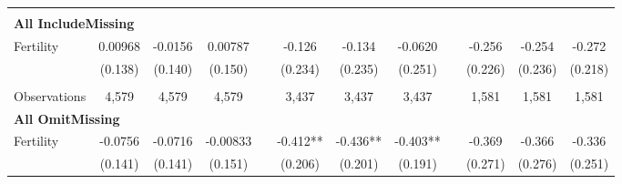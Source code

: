 \begin{landscape}
\begin{table}[htpb!]
\begin{center}
\begin{tabular}{lcccp{2mm}cccp{2mm}ccc}
\begin{footnotesize}\end{footnotesize}\\ 
\multicolumn{12}{l}{\textbf{All IncludeMissing}}\\ 
Fertility&0.00968&-0.0156&0.00787&&-0.126&-0.134&-0.0620&&-0.256&-0.254&-0.272\\
&(0.138)&(0.140)&(0.150)&&(0.234)&(0.235)&(0.251)&&(0.226)&(0.236)&(0.218)\\
\begin{footnotesize}\end{footnotesize}&\begin{footnotesize}\end{footnotesize}&\begin{footnotesize}\end{footnotesize}&\begin{footnotesize}\end{footnotesize}&\begin{footnotesize}\end{footnotesize}&\begin{footnotesize}\end{footnotesize}&\begin{footnotesize}\end{footnotesize}&\begin{footnotesize}\end{footnotesize}&\begin{footnotesize}\end{footnotesize}&\begin{footnotesize}\end{footnotesize}&\begin{footnotesize}\end{footnotesize}&\begin{footnotesize}\end{footnotesize}\\Observations&4,579&4,579&4,579&&3,437&3,437&3,437&&1,581&1,581&1,581\\
\multicolumn{12}{l}{\textbf{All OmitMissing}}\\ 
Fertility&-0.0756&-0.0716&-0.00833&&-0.412**&-0.436**&-0.403**&&-0.369&-0.366&-0.336\\
&(0.141)&(0.141)&(0.151)&&(0.206)&(0.201)&(0.191)&&(0.271)&(0.276)&(0.251)\\

\end{tabular}
\end{center}
\end{table}
\end{landscape}

